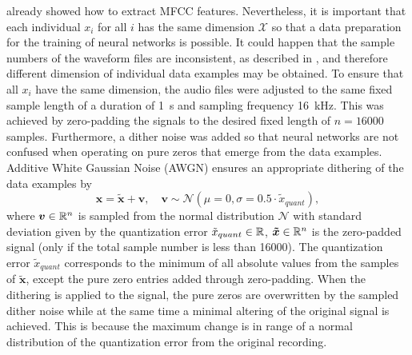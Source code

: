  already showed how to extract MFCC features.
Nevertheless, it is important that each individual $x_i$ for all $i$ has the same dimension $\mathcal{X}$ so that a data preparation for the training of neural networks is possible.
It could happen that the sample numbers of the waveform files are inconsistent, as described in , and therefore different dimension of individual data examples may be obtained.
To ensure that all $x_i$ have the same dimension, the audio files were adjusted to the same fixed sample length of a duration of \SI{1}{\second} and sampling frequency \SI{16}{\kilo\hertz}.
This was achieved by zero-padding the signals to the desired fixed length of $n = 16000$ samples.
Furthermore, a dither noise was added so that neural networks are not confused when operating on pure zeros that emerge from the data examples.
Additive White Gaussian Noise (AWGN) ensures an appropriate dithering of the data examples by
\begin{equation}\label{eq:exp_dither}
  \bm{x} = \bm{\tilde{x}} + \bm{v}, \quad \bm{v} \sim \mathcal{N}(\mu=0, \sigma=0.5 \cdot \tilde{x}_{quant}),
\end{equation}
where $\bm{v} \in \mathbb{R}^n$ is sampled from the normal distribution $\mathcal{N}$ with standard deviation given by the quantization error $\tilde{x}_{quant} \in \mathbb{R}$, $\bm{\tilde{x}} \in \mathbb{R}^n$ is the zero-padded signal (only if the total sample number is less than 16000).
The quantization error $\tilde{x}_{quant}$ corresponds to the minimum of all absolute values from the samples of $\bm{\tilde{x}}$, except the pure zero entries added through zero-padding.
When the dithering is applied to the signal, the pure zeros are overwritten by the sampled dither noise while at the same time a minimal altering of the original signal is achieved.
This is because the maximum change is in range of a normal distribution of the quantization error from the original recording.